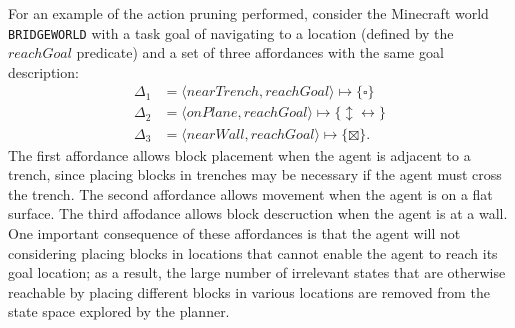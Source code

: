 \documentclass[]{article}
\begin{document}
For an example of the action pruning performed, consider the Minecraft world
\texttt{BRIDGEWORLD} with a task goal of navigating to a location (defined by the $reachGoal$ predicate) and a set of three affordances with the same goal description:
\begin{align*}
\Delta_1 &= \langle nearTrench, reachGoal \rangle \longmapsto \{\square\} \\
\Delta_2 &= \langle onPlane, reachGoal \rangle \longmapsto
\{\updownarrow \leftrightarrow\} \\
\Delta_3 &= \langle nearWall,
reachGoal \rangle \longmapsto \{\boxtimes \}.
\end{align*}
The first affordance allows block placement when the agent is adjacent to
a trench, since placing blocks in trenches may be necessary if the agent
must cross the trench. The second affordance allows movement when the agent
is on a flat surface. The third affodance allows block descruction when
the agent is at a wall. One important consequence of these affordances is that
the agent will not considering placing blocks in locations that cannot
enable the agent to reach its goal location; as a result, the large number of
irrelevant states that are otherwise reachable by placing different blocks
in various locations are removed from the state space explored by the planner.



\end{document}
